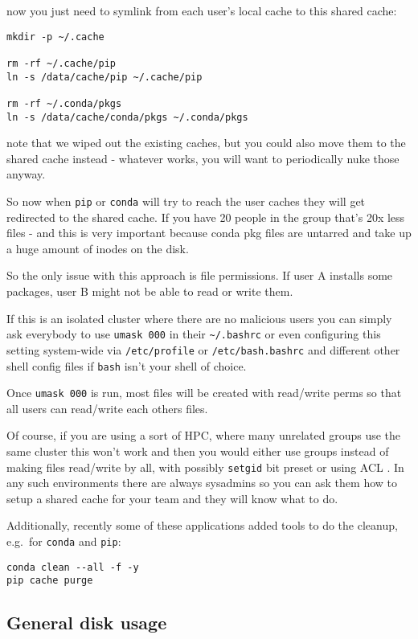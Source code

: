 \documentclass[
]{report}
\begin{document}
now you just need to symlink from each user's local cache to this shared
cache:

\begin{verbatim}
mkdir -p ~/.cache

rm -rf ~/.cache/pip
ln -s /data/cache/pip ~/.cache/pip

rm -rf ~/.conda/pkgs
ln -s /data/cache/conda/pkgs ~/.conda/pkgs
\end{verbatim}

note that we wiped out the existing caches, but you could also move them
to the shared cache instead - whatever works, you will want to
periodically nuke those anyway.

So now when \texttt{pip} or \texttt{conda} will try to reach the user
caches they will get redirected to the shared cache. If you have 20
people in the group that's 20x less files - and this is very important
because conda pkg files are untarred and take up a huge amount of inodes
on the disk.

So the only issue with this approach is file permissions. If user A
installs some packages, user B might not be able to read or write them.

If this is an isolated cluster where there are no malicious users you
can simply ask everybody to use \texttt{umask\ 000} in their
\texttt{\textasciitilde{}/.bashrc} or even configuring this setting
system-wide via \texttt{/etc/profile} or \texttt{/etc/bash.bashrc} and
different other shell config files if \texttt{bash} isn't your shell of
choice.

Once \texttt{umask\ 000} is run, most files will be created with
read/write perms so that all users can read/write each others files.

Of course, if you are using a sort of HPC, where many unrelated groups
use the same cluster this won't work and then you would either use
groups instead of making files read/write by all, with possibly
\texttt{setgid} bit preset or using ACL . In any such environments there
are always sysadmins so you can ask them how to setup a shared cache for
your team and they will know what to do.

Additionally, recently some of these applications added tools to do the
cleanup, e.g.~for \texttt{conda} and \texttt{pip}:

\begin{verbatim}
conda clean --all -f -y
pip cache purge
\end{verbatim}

\subsection{General disk usage}\label{general-disk-usage}
\end{document}

